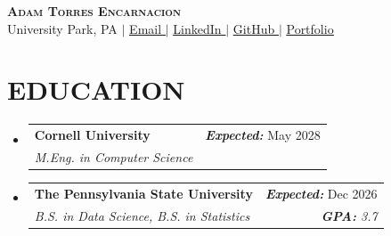\documentclass[letterpaper,11pt]{article}
\makeatletter
\newcommand{\resumeSubheading}[4]{
  \item
    \begin{tabular*}{0.97\textwidth}[t]{l@{\extracolsep{\fill}}r}
      \textbf{#1} & #2 \\
      \textit{\small#3} & \textit{\small #4} \\
    \end{tabular*}\vspace{-7pt}
}
\newcommand{\resumeSubHeadingListStart}{\begin{itemize}[leftmargin=0.15in, label={}]}
\newcommand{\resumeSubHeadingListEnd}{\end{itemize}}
\newcommand{\vercelLogo}{\raisebox{0.02em}{\scalebox{1.43}[1.148]{$\blacktriangle$}}}
\makeatother
\begin{document}
\begin{center}
    \textbf{\Huge \scshape Adam Torres Encarnacion} \\ \vspace{1pt}
    \small University Park, PA $|$ \href{mailto:art5809@psu.edu}{\underline{Email \faEnvelope}} $|$
    \href{https://www.linkedin.com/in/adam-torres-encarnacion/}{\underline{LinkedIn \faLinkedin}} $|$
    \href{https://github.com/0xABAN}{\underline{GitHub \faGithub}} $|$
    \href{https://advm.dev/}{\underline{Portfolio \vercelLogo}}
\end{center}


\section{\textbf{EDUCATION}}
  \resumeSubHeadingListStart
    \resumeSubheading
    {Cornell University}{\textbf{\textit{Expected:}} May 2028}
      {M.Eng. in Computer Science}{}
    \resumeSubheading
    {The Pennsylvania State University}{\textbf{\textit{Expected:}} Dec 2026}
      {B.S. in Data Science, B.S. in Statistics}{\textbf{\textit{GPA:}} 3.7}
  \resumeSubHeadingListEnd

\end{document}
